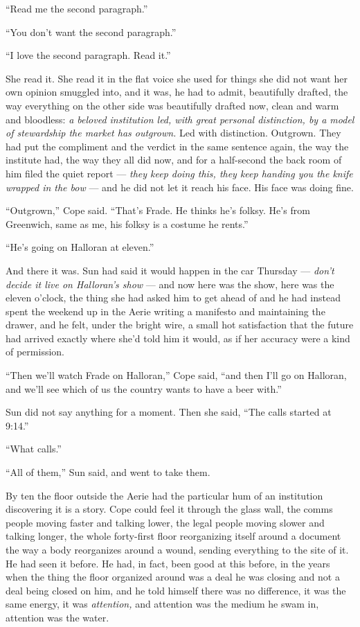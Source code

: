 \documentclass[11pt,openany]{book}
\newcommand{\scenebreak}{\par\vspace{0.5\baselineskip}\begin{center}\textasteriskcentered\quad\textasteriskcentered\quad\textasteriskcentered\end{center}\vspace{0.5\baselineskip}\par}
\begin{document}
``Read me the second paragraph.''

``You don't want the second paragraph.''

``I love the second paragraph. Read it.''

She read it. She read it in the flat voice she used for things she did not want her own opinion smuggled into, and it was, he had to admit, beautifully drafted, the way everything on the other side was beautifully drafted now, clean and warm and bloodless: \textit{a beloved institution led, with great personal distinction, by a model of stewardship the market has outgrown.} Led with distinction. Outgrown. They had put the compliment and the verdict in the same sentence again, the way the institute had, the way they all did now, and for a half-second the back room of him filed the quiet report --- \textit{they keep doing this, they keep handing you the knife wrapped in the bow} --- and he did not let it reach his face. His face was doing fine.

``Outgrown,'' Cope said. ``That's Frade. He thinks he's folksy. He's from Greenwich, same as me, his folksy is a costume he rents.''

``He's going on Halloran at eleven.''

And there it was. Sun had said it would happen in the car Thursday --- \textit{don't decide it live on Halloran's show} --- and now here was the show, here was the eleven o'clock, the thing she had asked him to get ahead of and he had instead spent the weekend up in the Aerie writing a manifesto and maintaining the drawer, and he felt, under the bright wire, a small hot satisfaction that the future had arrived exactly where she'd told him it would, as if her accuracy were a kind of permission.

``Then we'll watch Frade on Halloran,'' Cope said, ``and then I'll go on Halloran, and we'll see which of us the country wants to have a beer with.''

Sun did not say anything for a moment. Then she said, ``The calls started at 9:14.''

``What calls.''

``All of them,'' Sun said, and went to take them.


\scenebreak


By ten the floor outside the Aerie had the particular hum of an institution discovering it is a story. Cope could feel it through the glass wall, the comms people moving faster and talking lower, the legal people moving slower and talking longer, the whole forty-first floor reorganizing itself around a document the way a body reorganizes around a wound, sending everything to the site of it. He had seen it before. He had, in fact, been good at this before, in the years when the thing the floor organized around was a deal he was closing and not a deal being closed on him, and he told himself there was no difference, it was the same energy, it was \textit{attention,} and attention was the medium he swam in, attention was the water.
\end{document}
